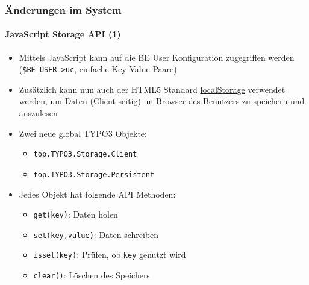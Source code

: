 
\begin{frame}[fragile]
	\frametitle{Änderungen im System}
	\framesubtitle{JavaScript Storage API (1)}

	\begin{itemize}
		\item Mittels JavaScript kann auf die BE User Konfiguration zugegriffen werden (\texttt{\$BE\_USER->uc}, einfache Key-Value Paare)
		\item Zusätzlich kann nun auch der HTML5 Standard \href{http://www.w3.org/TR/webstorage/}{localStorage}
			verwendet werden, um Daten (Client-seitig) im Browser des Benutzers
			zu speichern und auszulesen

		\item Zwei neue global TYPO3 Objekte:
			\begin{itemize}
				\item \texttt{top.TYPO3.Storage.Client}
				\item \texttt{top.TYPO3.Storage.Persistent}
			\end{itemize}

		\item Jedes Objekt hat folgende API Methoden:
			\begin{itemize}
				\item \texttt{get(key)}: Daten holen
				\item \texttt{set(key,value)}: Daten schreiben
				\item \texttt{isset(key)}: Prüfen, ob \texttt{key} genutzt wird
				\item \texttt{clear()}: Löschen des Speichers
			\end{itemize}

	\end{itemize}

\end{frame}


